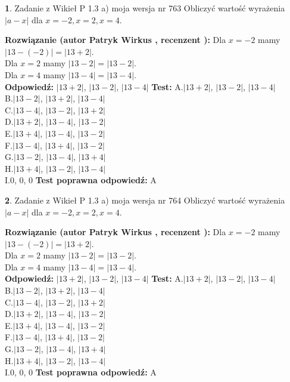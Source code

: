 \documentclass[12pt, a4paper]{article}
\theoremstyle{definition} %
\newtheorem{zad}{}
\newcommand{\zadStart}[1]{\begin{zad}#1\newline}
\newcommand{\zadStop}{\end{zad}}
\newcommand{\rozwStart}[2]{\noindent \textbf{Rozwiązanie (autor #1 , recenzent #2): }\newline}
\newcommand{\rozwStop}{\newline}
\newcommand{\odpStart}{\noindent \textbf{Odpowiedź:}\newline}
\newcommand{\odpStop}{\newline}
\newcommand{\testStart}{\noindent \textbf{Test:}\newline}
\newcommand{\testStop}{\newline}
\newcommand{\kluczStart}{\noindent \textbf{Test poprawna odpowiedź:}\newline}
\newcommand{\kluczStop}{\newline}
\begin{document}
\zadStart{Zadanie z Wikieł P 1.3 a) moja wersja nr 763}
Obliczyć wartość wyrażenia $|a - x|$ dla $x=-2,x=2,x=4$.
\zadStop
\rozwStart{Patryk Wirkus}{}
Dla $x = -2$ mamy $|13 - (-2)| = |13 + 2|$.\\
Dla $x = 2$ mamy $|13 - 2| = |13 - 2|$.\\
Dla $x = 4$ mamy $|13 - 4| = |13 - 4|$.\\
\rozwStop
\odpStart
$|13 + 2|$, $|13 - 2|$, $|13 - 4|$
\odpStop
\testStart
A.$|13 + 2|$, $|13 - 2|$, $|13 - 4|$\\
B.$|13 - 2|$, $|13 + 2|$, $|13 - 4|$\\
C.$|13 - 4|$, $|13 - 2|$, $|13 + 2|$\\
D.$|13 + 2|$, $|13 - 4|$, $|13 - 2|$\\
E.$|13 + 4|$, $|13 - 4|$, $|13 - 2|$\\
F.$|13 - 4|$, $|13 + 4|$, $|13 - 2|$\\
G.$|13 - 2|$, $|13 - 4|$, $|13 + 4|$\\
H.$|13 + 4|$, $|13 - 2|$, $|13 - 4|$\\
I.$0$, $0$, $0$
\testStop
\kluczStart
A
\kluczStop



\zadStart{Zadanie z Wikieł P 1.3 a) moja wersja nr 764}
Obliczyć wartość wyrażenia $|a - x|$ dla $x=-2,x=2,x=4$.
\zadStop
\rozwStart{Patryk Wirkus}{}
Dla $x = -2$ mamy $|13 - (-2)| = |13 + 2|$.\\
Dla $x = 2$ mamy $|13 - 2| = |13 - 2|$.\\
Dla $x = 4$ mamy $|13 - 4| = |13 - 4|$.\\
\rozwStop
\odpStart
$|13 + 2|$, $|13 - 2|$, $|13 - 4|$
\odpStop
\testStart
A.$|13 + 2|$, $|13 - 2|$, $|13 - 4|$\\
B.$|13 - 2|$, $|13 + 2|$, $|13 - 4|$\\
C.$|13 - 4|$, $|13 - 2|$, $|13 + 2|$\\
D.$|13 + 2|$, $|13 - 4|$, $|13 - 2|$\\
E.$|13 + 4|$, $|13 - 4|$, $|13 - 2|$\\
F.$|13 - 4|$, $|13 + 4|$, $|13 - 2|$\\
G.$|13 - 2|$, $|13 - 4|$, $|13 + 4|$\\
H.$|13 + 4|$, $|13 - 2|$, $|13 - 4|$\\
I.$0$, $0$, $0$
\testStop
\kluczStart
A
\kluczStop
\end{document}
